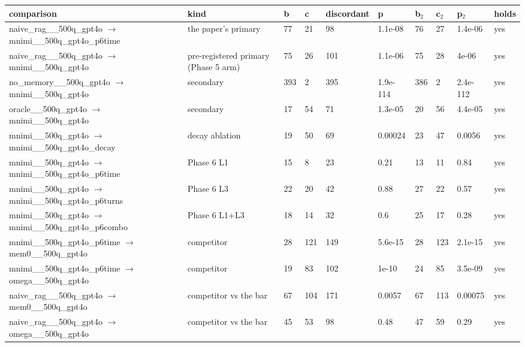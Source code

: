 \begin{tabular}{llllllllll}
\toprule
comparison & kind & b & c & discordant & p & b$_2$ & c$_2$ & p$_2$ & holds \\
\midrule
naive\_rag\_\_500q\_gpt4o $\rightarrow$ mnimi\_\_500q\_gpt4o\_p6time & the paper's primary & 77 & 21 & 98 & 1.1e-08 & 76 & 27 & 1.4e-06 & yes \\
naive\_rag\_\_500q\_gpt4o $\rightarrow$ mnimi\_\_500q\_gpt4o & pre-registered primary (Phase 5 arm) & 75 & 26 & 101 & 1.1e-06 & 75 & 28 & 4e-06 & yes \\
no\_memory\_\_500q\_gpt4o $\rightarrow$ mnimi\_\_500q\_gpt4o & secondary & 393 & 2 & 395 & 1.9e-114 & 386 & 2 & 2.4e-112 & yes \\
oracle\_\_500q\_gpt4o $\rightarrow$ mnimi\_\_500q\_gpt4o & secondary & 17 & 54 & 71 & 1.3e-05 & 20 & 56 & 4.4e-05 & yes \\
mnimi\_\_500q\_gpt4o $\rightarrow$ mnimi\_\_500q\_gpt4o\_decay & decay ablation & 19 & 50 & 69 & 0.00024 & 23 & 47 & 0.0056 & yes \\
mnimi\_\_500q\_gpt4o $\rightarrow$ mnimi\_\_500q\_gpt4o\_p6time & Phase 6 L1 & 15 & 8 & 23 & 0.21 & 13 & 11 & 0.84 & yes \\
mnimi\_\_500q\_gpt4o $\rightarrow$ mnimi\_\_500q\_gpt4o\_p6turns & Phase 6 L3 & 22 & 20 & 42 & 0.88 & 27 & 22 & 0.57 & yes \\
mnimi\_\_500q\_gpt4o $\rightarrow$ mnimi\_\_500q\_gpt4o\_p6combo & Phase 6 L1+L3 & 18 & 14 & 32 & 0.6 & 25 & 17 & 0.28 & yes \\
mnimi\_\_500q\_gpt4o\_p6time $\rightarrow$ mem0\_\_500q\_gpt4o & competitor & 28 & 121 & 149 & 5.6e-15 & 28 & 123 & 2.1e-15 & yes \\
mnimi\_\_500q\_gpt4o\_p6time $\rightarrow$ omega\_\_500q\_gpt4o & competitor & 19 & 83 & 102 & 1e-10 & 24 & 85 & 3.5e-09 & yes \\
naive\_rag\_\_500q\_gpt4o $\rightarrow$ mem0\_\_500q\_gpt4o & competitor vs the bar & 67 & 104 & 171 & 0.0057 & 67 & 113 & 0.00075 & yes \\
naive\_rag\_\_500q\_gpt4o $\rightarrow$ omega\_\_500q\_gpt4o & competitor vs the bar & 45 & 53 & 98 & 0.48 & 47 & 59 & 0.29 & yes \\
\bottomrule
\end{tabular}

